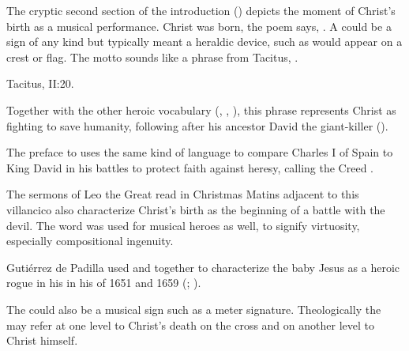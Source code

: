 The cryptic second section of the introduction () depicts the
moment of Christ's birth as a musical performance.
Christ was born, the poem says, .
A  could be a sign of any kind but typically meant a heraldic
device, such as would appear on a crest or flag.%
    \Autocite[]{Covarrubias:Tesoro}
The motto  sounds like a phrase from
Tacitus, .%
\begin{Footnote}
    Tacitus,  II:20.
\end{Footnote}
Together with the other heroic vocabulary (,
, ), this phrase represents Christ as
fighting to save humanity, following after his ancestor David the giant-killer
().%
\begin{Footnote}
    The preface to \autocite{Azevedo:Catecismo} uses the same kind of language
    to compare Charles I of Spain to King David in his battles to protect faith
    against heresy, calling the Creed .
\end{Footnote}
The sermons of Leo the Great read in Christmas Matins adjacent to this
villancico also characterize Christ's birth as the beginning of a battle with
the devil.%
    \Autocite[\XXX]{Catholic:Catechismus1614}
The word  was used for musical heroes as well, to signify
virtuosity, especially compositional ingenuity.%
\begin{Footnote}
    \Autocites
    []{Covarrubias:Tesoro}
    [in its musical sense, see the title of][]
    {Sanz:Guitarra}
    Gutiérrez de Padilla used  and  together
    to characterize the baby Jesus as a heroic rogue in his  in
    his  of 1651 and 1659 (;
    ).
\end{Footnote}
The  could also be a musical sign such as a meter signature.
Theologically the  may refer at one level to Christ's death on the
cross and on another level to Christ himself.



